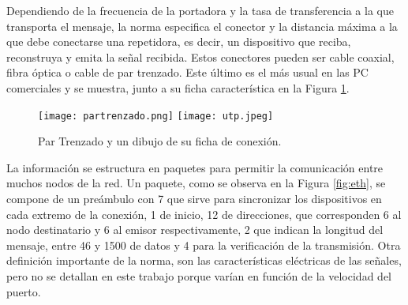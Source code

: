 
Dependiendo de la frecuencia de la portadora y la tasa de transferencia a la que transporta el mensaje, la norma especifica el conector y la distancia máxima a la que debe conectarse una repetidora, es decir, un dispositivo que reciba, reconstruya y emita la señal recibida. Estos conectores pueden ser cable coaxial, fibra óptica o cable de par trenzado. Este último es el más usual en las PC comerciales y se muestra, junto a su ficha característica en la Figura \ref{fig:utp}.%

\begin{figure}[b]
	\centering
	\texttt{[image: partrenzado.png]}
	\texttt{[image: utp.jpeg]}
	\caption{Par Trenzado y un dibujo de su ficha de conexión.}
	\label{fig:utp}
\end{figure}

La información se estructura en paquetes para permitir la comunicación entre muchos nodos de la red. Un paquete, como se observa en la Figura \ref{fig:eth}, se compone de un preámbulo con \SI{7}{\byte} que sirve para sincronizar los dispositivos en cada extremo de la conexión, \SI{1}{\byte} de inicio, \SI{12}{\byte} de direcciones, que corresponden 6 al nodo destinatario y 6 al emisor respectivamente, \SI{2}{\byte} que indican la longitud del mensaje, entre 46 y \SI{1500}{\byte} de datos y \SI{4}{\byte} para la verificación de la transmisión. Otra definición importante de la norma, son las características eléctricas de las señales, pero no se detallan en este trabajo porque varían en función de la velocidad del puerto.%


